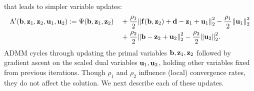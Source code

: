 that leads to simpler variable updates:
\begin{alignat}{2}
	&\Lambda'(\bmb, \bmz_1,\bmz_2,\bmu_1,\bmu_2) := \Psi(\bmb,\bmz_1,\bmz_2) 
		&&+ \frac{\rho_1}{2}\norm{\bmf(\bmb, \bmz_2) + \mathbf{d}-\bmz_1+\bmu_1}^2_2 			
		- \frac{\rho_1}{2} \norm{\bmu_1}^2_2 
		\nonumber 
		\\
	& 
		&&+ \frac{\rho_2}{2} \norm{\bmb - \bmz_2 + \bmu_2}^2_2 
		- \frac{\rho_2}{2} \norm{\bmu_2}^2_2. \label{eq:ss-rf,lagrangian-u}
\end{alignat}
ADMM cycles through updating the primal variables $\mathbf{b},\mathbf{z}_1,\mathbf{z}_2$
followed by gradient ascent on the scaled dual variables $\mathbf{u}_1,\mathbf{u}_2$, 
holding other variables fixed from previous iterations. 
Though $\rho_1$ and $\rho_2$ influence (local) convergence rates, 
they do not affect the solution. 
We next describe each of these updates.
